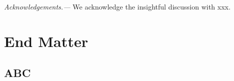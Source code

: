 \documentclass[twocolumn,superscriptaddress,aps,showpacs,amsmath,amstex,amssymb,citeautoscript,floatfix,pra,preprintnumbers]{revtex4-2}
\theoremstyle{plain}
\theoremstyle{plain}
\theoremstyle{plain}
\theoremstyle{plain}
\theoremstyle{plain}
\theoremstyle{plain}
\begin{document}
 

 
 

 
 
 
\textit{Acknowledgements.---} We acknowledge the insightful discussion with xxx.
 

 
\let\oldaddcontentsline\addcontentsline
\renewcommand{\addcontentsline}[3]{}

\let\addcontentsline\oldaddcontentsline

 \section*{End Matter}
 
\clearpage
\newpage
\onecolumngrid
 
\begin{appendix}
\section{ABC}
 
\end{appendix}
 
\end{document}
